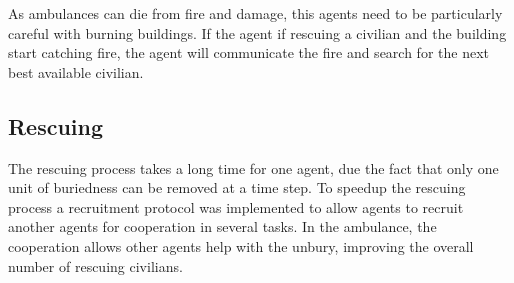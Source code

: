 As ambulances can die from fire and damage, this agents need to be particularly careful with burning buildings. If the agent if rescuing a civilian and the building start catching fire, the agent will communicate the fire and search for the next best available civilian.



\subsection{Rescuing}

The rescuing process takes a long time for one agent, due the fact that only one unit of buriedness can be removed at a time step. To speedup the rescuing process a recruitment protocol was implemented to allow agents to recruit another agents for cooperation in several tasks. In the ambulance, the cooperation allows other agents help with the unbury, improving the overall number of rescuing civilians.
